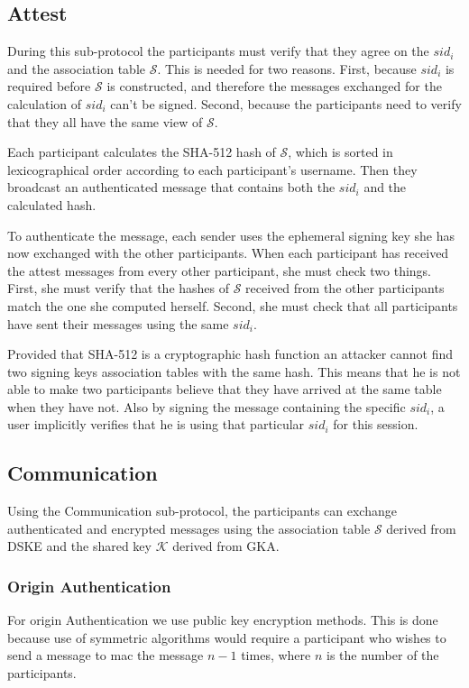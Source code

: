\subsection{Attest}
\label{subsections:attest}
During this sub-protocol the participants must verify that they agree on the $sid_i$ and the association table $\mathcal{S}$. This is needed for two reasons. First, because $sid_i$ is required before $\mathcal{S}$ is constructed, and therefore the messages exchanged for the calculation of $sid_i$ can't be signed. Second, because the participants need to verify that they all have the same view of $\mathcal{S}$.

Each participant calculates the SHA-512 hash of $\mathcal{S}$, which is sorted in lexicographical order according to each participant's username. Then they broadcast an authenticated message that contains both the $sid_i$ and the calculated hash.

To authenticate the message, each sender uses the ephemeral signing key she has now exchanged with the other participants. When each participant has received the attest messages from every other participant, she must check two things. First, she must verify that the hashes of $\mathcal{S}$ received from the other participants match the one she computed herself. Second, she must check that all participants have sent their messages using the same $sid_i$.

Provided that SHA-512 is a cryptographic hash function an attacker cannot find two signing keys association tables with the same hash. This means that he is not able to make two participants believe that they have arrived at the same table when they have not. Also by signing the message containing the specific $sid_i$, a user implicitly verifies that he is using that particular $sid_i$ for this session.

\subsection{Communication}
\label{subsections:communication}
Using the Communication sub-protocol, the participants can exchange authenticated and encrypted messages using the association table $\mathcal{S}$ derived from DSKE and the shared key $\mathcal{K}$ derived from GKA.

\subsubsection{Origin Authentication}
For origin Authentication we use public key encryption methods. This is done because use of symmetric algorithms would require a participant who wishes to send a message to mac the message $n-1$ times, where $n$ is the number of the participants.

